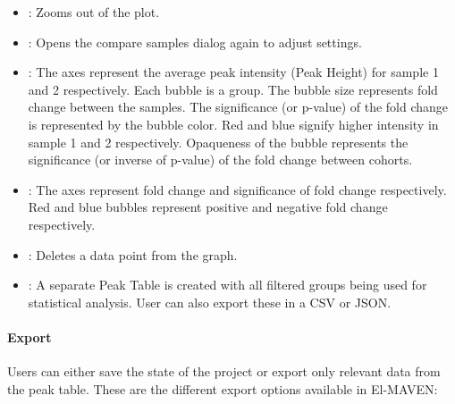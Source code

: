 \documentclass[letterpaper,10pt,english,openany,oneside]{sphinxmanual}
\begin{document}
\begin{itemize}
\item {} 
 : Zooms out of the plot.

\item {} 
 : Opens the compare samples dialog again to adjust settings.

\item {} 
 : The axes represent the average peak intensity (Peak Height) for sample 1 and 2 respectively. Each bubble is a group. The bubble size represents fold change between the samples. The significance (or p-value) of the fold change is represented by the bubble color. Red and blue signify higher intensity in sample 1 and 2 respectively. Opaqueness of the bubble represents the significance (or inverse of p-value) of the fold change between cohorts.

\item {} 
 : The axes represent fold change and significance of fold change respectively. Red and blue bubbles represent positive and negative fold change respectively.

\item {} 
 : Deletes a data point from the graph.

\item {} 
 : A separate Peak Table is created with all filtered groups being used for statistical analysis. User can also export these in a CSV or JSON.

\end{itemize}


\paragraph{Export}
\label{\detokenize{IntroductiontoElMAVENUI:id10}}
Users can either save the state of the project or export only relevant data from the peak table. These are the different export options available in El-MAVEN:
\end{document}
